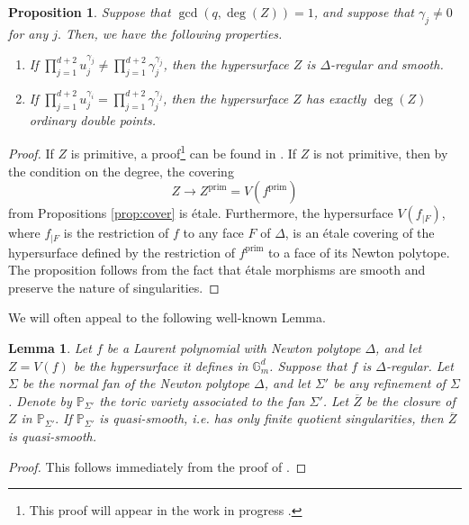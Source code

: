 \documentclass[11pt, reqno]{amsart}
\theoremstyle{plain}
\newtheorem{prop}[theo]{Proposition}
\newtheorem{lem}[theo]{Lemma}
\theoremstyle{definition}
\newcommand{\ga}{\gamma}
\begin{document}
\begin{prop}\label{prop:cover-smooth}
Suppose that $\gcd(q,\deg(Z))=1$, and suppose that $\ga_j \neq 0$ for any $j.$ Then, we have the following properties.
\begin{enumerate}
    \item If $ \prod_{j=1}^{d+2} u_j^{\gamma_j} \neq \prod_{j=1}^{d+2} \gamma_j^{\gamma_j}$, then the hypersurface $Z$ is $\Delta$-regular and smooth.
    \item If $ \prod_{j=1}^{d+2} u_j^{\gamma_i} = \prod_{j=1}^{d+2} \gamma_j^{\gamma_j}$, then the hypersurface $Z$ has exactly $\deg(Z)$ ordinary double points.
\end{enumerate}
\end{prop}
\begin{proof}
    If $Z$ is primitive, a proof\footnote{This proof will appear in the work in progress \cite{asem-giulia}.} can be found in \cite[Proposition 1.36]{my-thesis}.
    If $Z$ is not primitive, then by the condition on the degree, the covering 
    \[
    Z \to Z^{\operatorname{prim}} = V(f^{\operatorname{prim}}) 
    \]
    from Propositions \ref{prop:cover} is étale. Furthermore, the hypersurface $V(f_{|F})$, where $f_{|F}$ is the restriction of $f$ to any face $F$ of $\Delta$, is an étale covering of the hypersurface defined by the restriction of $f^{\operatorname{prim}}$ to a face of its Newton polytope.
    The proposition follows from the fact that étale morphisms are smooth and preserve the nature of singularities.
\end{proof}
We will often appeal to the following well-known Lemma.
\begin{lem}\label{lem:quasi-smooth-compactification}
Let $f$ be a Laurent polynomial with Newton polytope $\Delta$, and let $Z= V(f)$ be the hypersurface it defines in $\mathbb{G}_m^d$. Suppose that $f$ is $\Delta$-regular.  Let $\Sigma$ be the normal fan of the Newton polytope $\Delta$, and let $\Sigma'$ be any refinement of $\Sigma$.  Denote by $\mathbb{P}_{\Sigma'}$ the toric variety associated to the fan $\Sigma'$. 
Let $\overline{Z}$ be the closure of $Z$  in $\mathbb{P}_{\Sigma'}.$ If $\mathbb{P}_{\Sigma'}$ is quasi-smooth, i.e. has only finite quotient singularities, then $\overline{Z}$ is quasi-smooth. 
\end{lem}
\begin{proof}
This follows immediately from the proof of \cite[Lemma 2.3]{Denef-Loeser}.
\end{proof}
\end{document}
